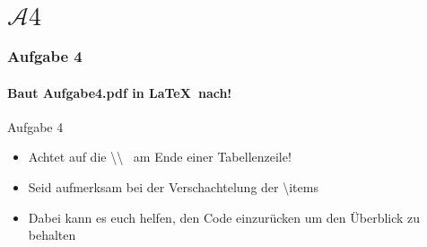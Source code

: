 \section{$\mathcal{A}4$} 
\begin{frame}
\frametitle{Aufgabe 4}
\framesubtitle{Baut Aufgabe4.pdf in \LaTeX ~nach!} 

\begin{block}{Aufgabe 4}
\begin{itemize}
  \item Achtet auf die \color{nounibaredII}\textbackslash \textbackslash  \color{black}~ am Ende einer Tabellenzeile!%
  \item Seid aufmerksam bei der Verschachtelung der \color{nounibaredII}\textbackslash item\color{black}s%
  \item Dabei kann es euch helfen, den Code einzur\"ucken um den \"Uberblick zu behalten%
\end{itemize}
\end{block}
\end{frame}
